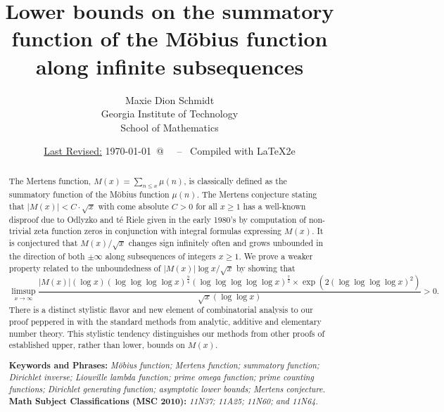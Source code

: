 \documentclass[11pt,reqno,a4letter]{article}
\title{
       \LARGE{
       Lower bounds on the summatory function of the M\"obius function along infinite subsequences 
       } 
}
\author{{\Large Maxie Dion Schmidt} \\ 
        {\normalsize Georgia Institute of Technology} \\[0.025cm] 
        {\normalsize School of Mathematics} 
}
\date{\small\underline{Last Revised:} \today \ @\ \hhmmsstime{} \ -- \ Compiled with \LaTeX2e}
\numberwithin{figure}{section}
\numberwithin{table}{section}
\theoremstyle{plain}
\numberwithin{theorem}{section}
\theoremstyle{definition}
\begin{document}
 

\maketitle

\begin{abstract} 
The Mertens function, $M(x) = \sum_{n \leq x} \mu(n)$, is classically 
defined as the summatory function of the M\"obius function $\mu(n)$. 
The Mertens conjecture stating that $|M(x)| < C \cdot \sqrt{x}$ with come absolute $C > 0$ for all 
$x \geq 1$ has a well-known disproof due to Odlyzko and t\'{e} Riele given in the early 1980's by computation of 
non-trivial zeta function zeros in conjunction with integral formulas expressing $M(x)$. 
It is conjectured that $M(x) / \sqrt{x}$ changes sign infinitely often and grows 
unbounded in the direction of both $\pm \infty$ along subsequences of integers $x \geq 1$. 
We prove a weaker property related to the unboundedness of $|M(x)| \log x /\sqrt{x}$ by showing that 
$$\limsup_{x \rightarrow \infty} \frac{|M(x)| (\log x) (\log\log\log\log x)^{\frac{9}{4}} 
  (\log\log\log\log\log x)^{\frac{7}{2}} \times \exp\left(2 (\log\log\log\log x)^2\right)}{ 
  \sqrt{x} (\log\log x)} > 0.$$ 
There is a distinct stylistic 
flavor and new element of combinatorial analysis to our proof 
peppered in with the standard methods from analytic, additive and elementary number theory. 
This stylistic tendency distinguishes 
our methods from other proofs of established upper, rather than lower, bounds on $M(x)$. 

\bigskip 
\noindent
\textbf{Keywords and Phrases:} {\it M\"obius function; Mertens function; summatory function; 
                                    Dirichlet inverse; Liouville lambda function; prime omega function; 
                                    prime counting functions; Dirichlet generating function; 
                                    asymptotic lower bounds; Mertens conjecture. } \\ 
\textbf{Math Subject Classifications (MSC 2010):} {\it 11N37; 11A25; 11N60; and 11N64. } 
\end{abstract} 
\end{document}
